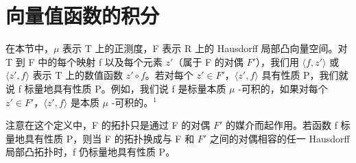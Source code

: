 \section{向量值函数的积分}

在本节中，\(\mu\) 表示 T 上的正测度，F 表示 R 上的 Hausdorff 局部凸向量空间。对 T 到 F 中的每个映射 f 以及每个元素 \(z'\)（属于 F 的对偶 \(F'\)），我们用 \(\langle f, z' \rangle\) 或 \(\langle z', f \rangle\) 表示 T 上的数值函数 \(z' \circ f\)。若对每个 \(z' \in F'\)，\(\langle z', f \rangle\) 具有性质 P，我们就说 f 标量地具有性质 P。例如，我们说 f 是标量本质 \(\mu\) -可积的，如果对每个 \(z' \in F'\)，\(\langle z', f \rangle\) 是本质 \(\mu\) -可积的。\(^{1}\)

注意在这个定义中，F 的拓扑只是通过 F 的对偶 \(F'\) 的媒介而起作用。若函数 f 标量地具有性质 P，则当 F 的拓扑换成与 F 和 \(F'\) 之间的对偶相容的任一 Hausdorff 局部凸拓扑时，f 仍标量地具有性质 P。

